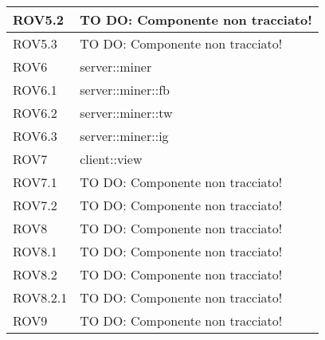 \begin{center}
\begin{longtable}{| p{4cm} | p{8cm} |}
\hline
ROV5.2 & TO DO: Componente non tracciato! \\
\hline
ROV5.3 & TO DO: Componente non tracciato! \\
\hline
ROV6 & server::miner \\
\hline
ROV6.1 & server::miner::fb \\
\hline
ROV6.2 & server::miner::tw \\
\hline
ROV6.3 & server::miner::ig \\
\hline
ROV7 & client::view \\
\hline
ROV7.1 & TO DO: Componente non tracciato! \\
\hline
ROV7.2 & TO DO: Componente non tracciato! \\
\hline
ROV8 & TO DO: Componente non tracciato! \\
\hline
ROV8.1 & TO DO: Componente non tracciato! \\
\hline
ROV8.2 & TO DO: Componente non tracciato! \\
\hline
ROV8.2.1 & TO DO: Componente non tracciato! \\
\hline
ROV9 & TO DO: Componente non tracciato! \\
\hline
\end{longtable}
\egroup
\end{center}
